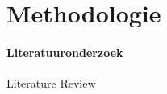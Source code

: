 \graphicspath{{2_Body/Figures/}}




\chapter{Methodologie}
\label{chapter:body}
\thispagestyle{myheadings}



\subsubsection{Literatuuronderzoek}
\begin{frame}{Literature Review}
	\begin{table}[htbp]
		\footnotesize
		

\end{table}
\end{frame}
